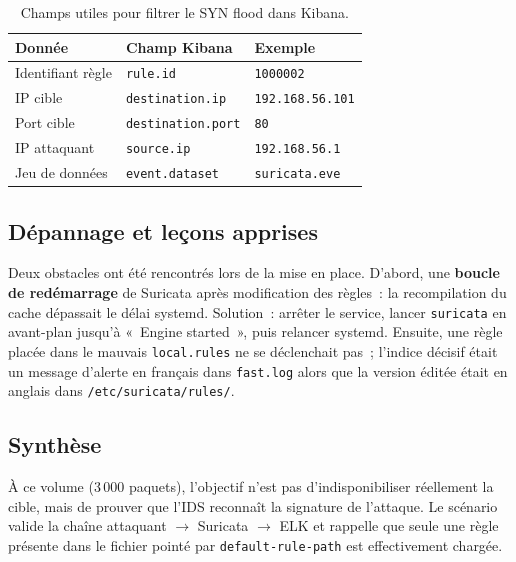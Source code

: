 \documentclass[12pt]{article}
\begin{document}
\begin{table}[htbp]
  \centering
  \begin{tabular}{@{}lll@{}}
    \toprule
    \textbf{Donnée} & \textbf{Champ Kibana} & \textbf{Exemple} \\
    \midrule
    Identifiant règle  & \texttt{rule.id}              & \texttt{1000002} \\
    IP cible           & \texttt{destination.ip}       & \texttt{192.168.56.101} \\
    Port cible         & \texttt{destination.port}     & \texttt{80} \\
    IP attaquant       & \texttt{source.ip}            & \texttt{192.168.56.1} \\
    Jeu de données     & \texttt{event.dataset}        & \texttt{suricata.eve} \\
    \bottomrule
  \end{tabular}
  \caption{Champs utiles pour filtrer le SYN flood dans Kibana.}
  \label{tab:syn_fields}
\end{table}

\subsection{Dépannage et leçons apprises}

Deux obstacles ont été rencontrés lors de la mise en place. D'abord, une
\textbf{boucle de redémarrage} de Suricata après modification des règles~: la
recompilation du cache dépassait le délai systemd. Solution~: arrêter le
service, lancer \texttt{suricata} en avant-plan jusqu'à «~Engine started~», puis
relancer systemd. Ensuite, une règle placée dans le mauvais \texttt{local.rules}
ne se déclenchait pas~; l'indice décisif était un message d'alerte en français
dans \texttt{fast.log} alors que la version éditée était en anglais dans
\texttt{/etc/suricata/rules/}.

\subsection{Synthèse}

À ce volume (3\,000 paquets), l'objectif n'est pas d'indisponibiliser réellement
la cible, mais de prouver que l'IDS reconnaît la signature de l'attaque. Le
scénario valide la chaîne attaquant $\rightarrow$ Suricata $\rightarrow$ ELK et
rappelle que seule une règle présente dans le fichier pointé par
\texttt{default-rule-path} est effectivement chargée.

\end{document}
